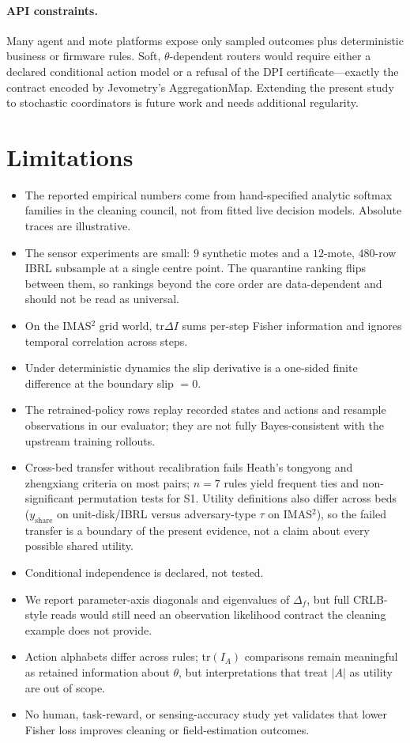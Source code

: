 \documentclass[11pt,a4paper]{article}
\begin{document}
\paragraph{API constraints.}
Many agent and mote platforms expose only sampled outcomes plus deterministic
business or firmware rules. Soft, $\theta$-dependent routers would require
either a declared conditional action model or a refusal of the DPI
certificate---exactly the contract encoded by Jevometry's AggregationMap.
Extending the present study to stochastic coordinators is future work and needs
additional regularity.

\section{Limitations}
\label{sec:limitations}

\begin{itemize}
  \item The reported empirical numbers come from hand-specified analytic
  softmax families in the cleaning council, not from fitted live decision
  models. Absolute traces are illustrative.
  \item The sensor experiments are small: $9$ synthetic motes and a
  $12$-mote, $480$-row IBRL subsample at a single centre point. The
  quarantine ranking flips between them, so rankings beyond the core order
  are data-dependent and should not be read as universal.
  \item On the IMAS$^2$ grid world, $\mathrm{tr}\Delta I$ sums per-step Fisher
  information and ignores temporal correlation across steps.
  \item Under deterministic dynamics the slip derivative is a one-sided finite
  difference at the boundary slip $=0$.
  \item The retrained-policy rows replay recorded states and actions and
  resample observations in our evaluator; they are not fully Bayes-consistent
  with the upstream training rollouts.
  \item Cross-bed transfer without recalibration fails Heath's tongyong and zhengxiang criteria on most pairs; $n=7$ rules yield frequent ties and non-significant permutation tests for S1. Utility definitions also differ across beds ($y_{\mathrm{share}}$ on unit-disk/IBRL versus adversary-type $\tau$ on IMAS$^2$), so the failed transfer is a boundary of the present evidence, not a claim about every possible shared utility.
  \item Conditional independence is declared, not tested.
  \item We report parameter-axis diagonals and eigenvalues of $\Delta_f$, but
  full CRLB-style reads would still need an observation likelihood contract
  the cleaning example does not provide.
  \item Action alphabets differ across rules; $\mathrm{tr}(I_A)$ comparisons
  remain meaningful as retained information about $\theta$, but
  interpretations that treat $|A|$ as utility are out of scope.
  \item No human, task-reward, or sensing-accuracy study yet validates that
  lower Fisher loss improves cleaning or field-estimation outcomes.
\end{itemize}
\end{document}
